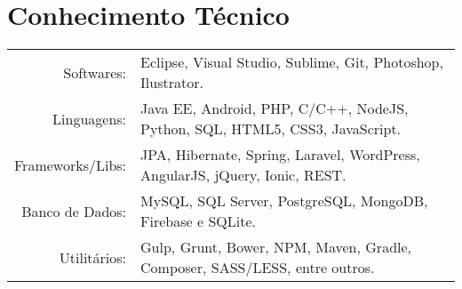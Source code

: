 \documentclass[a4paper,10pt]{article}
\begin{document}
\section{Conhecimento Técnico}
\begin{tabular}{rl}
	Softwares: & Eclipse, Visual Studio, Sublime, Git, Photoshop, Ilustrator.\\
	Linguagens: & Java EE, Android, PHP, C/C++, NodeJS, Python, SQL, HTML5, CSS3, JavaScript.\\
	Frameworks/Libs: & JPA, Hibernate, Spring, Laravel, WordPress, AngularJS, jQuery, Ionic, REST.\\
	Banco de Dados: & MySQL, SQL Server, PostgreSQL, MongoDB, Firebase e SQLite.\\
	Utilitários: & Gulp, Grunt, Bower, NPM, Maven, Gradle, Composer, SASS/LESS, entre outros.
\end{tabular}

\end{document}

